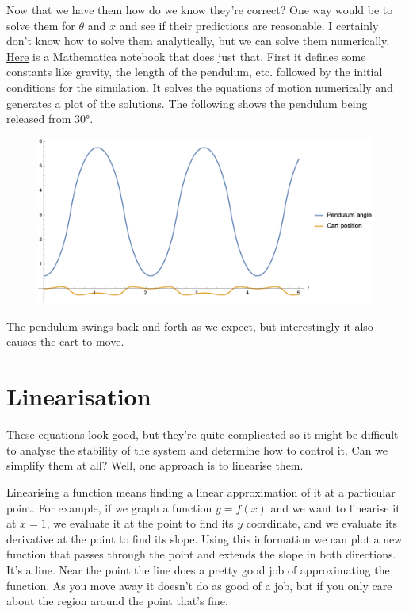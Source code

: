 \documentclass{article}
\begin{document}
Now that we have them how do we know they're correct? One way would be to solve them for $\theta$ and $x$ and see if their predictions are reasonable. I certainly don't know how to solve them analytically, but we can solve them numerically. \href{https://github.com/chrisdoble/self-balancing-inverted-pendulum/blob/master/notebooks/uncontrolled.nb}{Here} is a Mathematica notebook that does just that. First it defines some constants like gravity, the length of the pendulum, etc. followed by the initial conditions for the simulation. It solves the equations of motion numerically and generates a plot of the solutions. The following shows the pendulum being released from $\ang{30}$.

\begin{figure}[H]
  \centering
  \includegraphics[width=\textwidth]{uncontrolled}
\end{figure}

The pendulum swings back and forth as we expect, but interestingly it also causes the cart to move.

\section{Linearisation}

These equations look good, but they're quite complicated so it might be difficult to analyse the stability of the system and determine how to control it. Can we simplify them at all? Well, one approach is to linearise them.

Linearising a function means finding a linear approximation of it at a particular point. For example, if we graph a function $y = f(x)$ and we want to linearise it at $x = 1$, we evaluate it at the point to find its $y$ coordinate, and we evaluate its derivative at the point to find its slope. Using this information we can plot a new function that passes through the point and extends the slope in both directions. It's a line. Near the point the line does a pretty good job of approximating the function. As you move away it doesn't do as good of a job, but if you only care about the region around the point that's fine.
\end{document}
